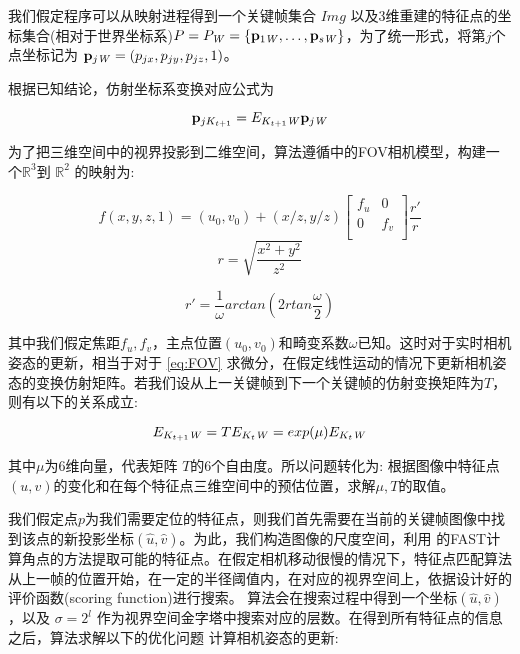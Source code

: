 我们假定程序可以从映射进程得到一个关键帧集合 $Img$ 以及3维重建的特征点的坐标集合(相对于世界坐标系)$P=P_{\mathit{W}}=\{\mathbf{p}_{1\mathit{W}},\ldots,\mathbf{p}_{s\mathit{W}}\}$，为了统一形式，将第$j$个点坐标记为 $\mathbf{p}_{j\mathit{W}}= (p_{jx},p_{jy},p_{jz},1)$。

根据已知结论，仿射坐标系变换对应公式为

\begin{equation}
\mathbf{p}_{jK_{t+1}}= E_{K_{t+1}\mathit{W}} \mathbf{p}_{j\mathit{W}}
\end{equation}

为了把三维空间中的视界投影到二维空间，算法遵循\citep{deng:01a}中的FOV相机模型，构建一个$\mathbb{R}^3$到 $\mathbb{R}^2$ 的映射为:

\begin{equation}
\label{eq:FOV}
f(x,y,z,1)=(u_0,v_0) + (x/z,y/z) 
\begin{bmatrix}
       f_u  & 0 \\
       0 & f_v  \\
\end{bmatrix} \frac{r'}{r}
\end{equation}
\begin{equation}
r= \sqrt{\frac{x^2+y^2}{z^2}}
\end{equation}

\begin{equation}
r'= \frac{1}{\omega} arctan(2rtan\frac{\omega}{2})
\end{equation}

其中我们假定焦距$f_u,f_v$，主点位置$(u_0,v_0)$和畸变系数$\omega$已知。这时对于实时相机姿态的更新，相当于对于 \autoref{eq:FOV} 求微分，在假定线性运动的情况下更新相机姿态的变换仿射矩阵。若我们设从上一关键帧到下一个关键帧的仿射变换矩阵为$T$，则有以下的关系成立:

\begin{equation}
E_{K_{t+1}\mathit{W}}  = T E_{K_{t}\mathit{W}} = exp(\mu) E_{K_{t}\mathit{W}}
\end{equation}

其中$\mu$为6维向量，代表矩阵 $T$的6个自由度。所以问题转化为: 根据图像中特征点$(u,v)$的变化和在每个特征点三维空间中的预估位置，求解$\mu,T$的取值。


我们假定点$p$为我们需要定位的特征点，则我们首先需要在当前的关键帧图像中找到该点的新投影坐标$(\hat{u},\hat{v})$。为此，我们构造图像的尺度空间，利用 %
的FAST计算角点的方法提取可能的特征点。在假定相机移动很慢的情况下，特征点匹配算法从上一帧的位置开始，在一定的半径阈值内，在对应的视界空间上，依据设计好的评价函数(scoring function)进行搜索。
算法会在搜索过程中得到一个坐标$(\hat{u},\hat{v})$，以及 $\sigma=2^l$ 作为视界空间金字塔中搜索对应的层数。在得到所有特征点的信息之后，算法求解以下的优化问题
计算相机姿态的更新:

